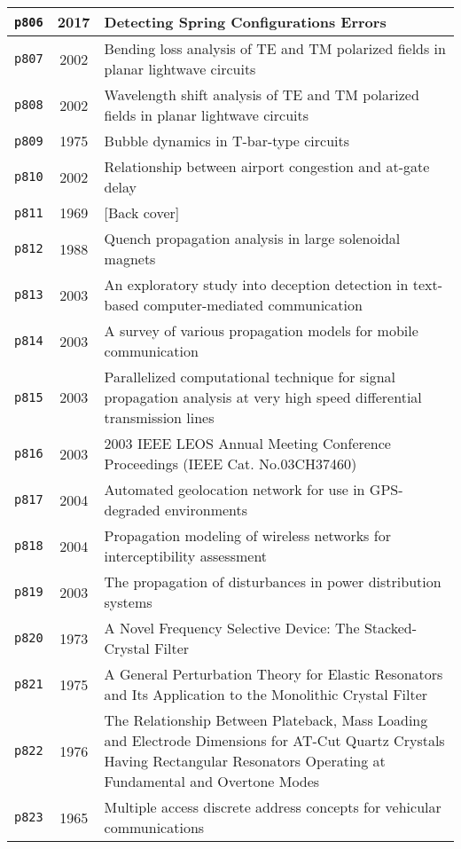 \begin{longtable}{| c | c | p{16cm} |}
  \hline
  \texttt{p806} & 2017 & Detecting Spring Configurations Errors \\
  \hline
  \texttt{p807} & 2002 & Bending loss analysis of TE and TM polarized fields in planar lightwave circuits \\
  \hline
  \texttt{p808} & 2002 & Wavelength shift analysis of TE and TM polarized fields in planar lightwave circuits \\
  \hline
  \texttt{p809} & 1975 & Bubble dynamics in T-bar-type circuits \\
  \hline
  \texttt{p810} & 2002 & Relationship between airport congestion and at-gate delay \\
  \hline
  \texttt{p811} & 1969 & [Back cover] \\
  \hline
  \texttt{p812} & 1988 & Quench propagation analysis in large solenoidal magnets \\
  \hline
  \texttt{p813} & 2003 & An exploratory study into deception detection in text-based computer-mediated communication \\
  \hline
  \texttt{p814} & 2003 & A survey of various propagation models for mobile communication \\
  \hline
  \texttt{p815} & 2003 & Parallelized computational technique for signal propagation analysis at very high speed differential transmission lines \\
  \hline
  \texttt{p816} & 2003 & 2003 IEEE LEOS Annual Meeting Conference Proceedings (IEEE Cat. No.03CH37460) \\
  \hline
  \texttt{p817} & 2004 & Automated geolocation network for use in GPS-degraded environments \\
  \hline
  \texttt{p818} & 2004 & Propagation modeling of wireless networks for interceptibility assessment \\
  \hline
  \texttt{p819} & 2003 & The propagation of disturbances in power distribution systems \\
  \hline
  \texttt{p820} & 1973 & A Novel Frequency Selective Device: The Stacked-Crystal Filter \\
  \hline
  \texttt{p821} & 1975 & A General Perturbation Theory for Elastic Resonators and Its Application to the Monolithic Crystal Filter \\
  \hline
  \texttt{p822} & 1976 & The Relationship Between Plateback, Mass Loading and Electrode Dimensions for AT-Cut Quartz Crystals Having Rectangular Resonators Operating at Fundamental and Overtone Modes \\
  \hline
  \texttt{p823} & 1965 & Multiple access discrete address concepts for vehicular communications \\

\end{longtable}
